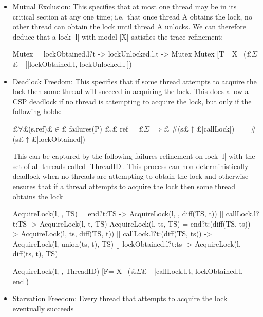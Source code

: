 \begin{itemize} 
  \item Mutual Exclusion: This specifies that at most one thread may be in its critical section at any one time; i.e.~that once thread A obtains the lock, no other thread can obtain the lock until thread A unlocks. We can therefore deduce that a lock |l| with model |X| satisfies the trace refinement:  
  
  \begin{cspm}
    Mutex = lockObtained.l?t -> lockUnlocked.l.t -> Mutex
    Mutex [T= X \ (£$\Sigma$£ - [|lockObtained.l, lockUnlocked.l|])\end{cspm}

  \item Deadlock Freedom: This specifies that if some thread attempts to acquire the lock then some thread will succeed in acquiring the lock\cite{TAoMP}. This does allow a CSP deadlock  if no thread is attempting to acquire the lock, but only if the following holds: 
  
  \begin{cspm}
    £$\forall$£(s,ref)£$ \in$£ failures(P) £$.$£ ref = £$\Sigma \implies$£ #(s£$\uparrow$£{|callLock|}) == #(s£$\uparrow$£{|lockObtained|})\end{cspm}
  
  This can be captured by the following failures refinement on lock |l| with the set of all threads called |ThreadID|. This process can non-deterministically deadlock when no threads are attempting to obtain the lock and otherwise ensures that if a thread attempts to acquire the lock then some thread obtains the lock

  \begin{cspm}
    AcquireLock(l, {}, TS) =
      end?t:TS -> AcquireLock(l, {}, diff(TS, {t}))
      [] callLock.l?t:TS -> AcquireLock(l, {t}, TS)
    AcquireLock(l, ts, TS) = 
      end?t:(diff(TS, ts)) -> AcquireLock(l, ts, diff(TS, {t})) 
      [] callLock.l?t:(diff(TS, ts)) -> AcquireLock(l, union(ts, {t}), TS)
      [] lockObtained.l?t:ts -> AcquireLock(l, diff(ts, {t}), TS)

    AcquireLock(l, {}, ThreadID) [F= 
        X \ (£$\Sigma$£ - {|callLock.l.t, lockObtained.l, end|})
  \end{cspm}
  \item Starvation Freedom: Every thread that attempts to acquire the lock eventually succeeds 
  \label{lockCriteria}
\end{itemize}

